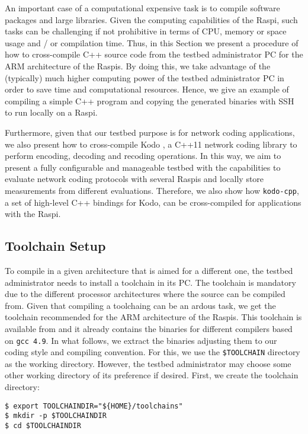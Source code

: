 \label{sec:cross_compilation}
An important case of a computational expensive task is to compile software
packages and large libraries. Given the computing capabilities of the
\ac{Raspi}, such tasks can be challenging if not prohibitive in terms of
\ac{CPU}, memory or space usage and / or compilation time. Thus, in
this Section we present a procedure of how to cross-compile C++
source code from the testbed administrator \ac{PC} for the \ac{ARM}
architecture of the \ac{Raspi}s. By doing this, we take advantage
of the (typically) much higher computing power of the testbed
administrator \ac{PC} in order to save time and computational resources.
Hence, we give an example of compiling a simple C++ program and
copying the generated binaries with \ac{SSH} to run locally
on a \ac{Raspi}.

Furthermore, given that our testbed purpose is for
network coding applications, we also present how to cross-compile Kodo
\cite{kodo2011pedersen}, a C++11 network coding library to perform
encoding, decoding and recoding operations. In this way, we aim to present
a fully configurable and manageable testbed with the capabilities to
evaluate network coding protocols with several \ac{Raspi}s and locally
store measurements from different evaluations. Therefore, we also show
how \texttt{kodo-cpp}, a set of high-level C++ bindings for Kodo, can be
cross-compiled for applications with the \ac{Raspi}.

\subsection{Toolchain Setup}
To compile in a given architecture that is aimed for a different one,
the testbed administrator needs to install a toolchain in its \ac{PC}.
The toolchain is mandatory due to the different processor architectures
where the source can be compiled from.
Given that compiling a toolchaing can be an ardous task, we get the toolchain
recommended for the \ac{ARM} architecture of the \ac{Raspi}s.
This toolchain is available from \cite{2016rpitoolchain} and
it already contains the binaries for different compilers based on
\texttt{gcc 4.9}. In what follows, we extract the binaries adjusting
them to our coding style and compiling convention. For this, we use the
\texttt{\$TOOLCHAIN} directory as the working directory. However,
the testbed administrator may choose some other working directory of
its preference if desired. First, we create the toolchain directory:

\begin{lstlisting}[]
$ export TOOLCHAINDIR="${HOME}/toolchains"
$ mkdir -p $TOOLCHAINDIR
$ cd $TOOLCHAINDIR
\end{lstlisting}
\FloatBarrier
\vspace{-5mm}

